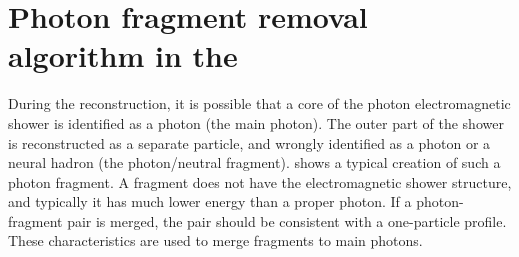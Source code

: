 \section{Photon fragment removal algorithm in the \ECAL}
\label{sec:photonFragRemoval}
During the reconstruction, it is possible that a core of the photon electromagnetic shower is identified as a photon (the main photon). The outer part of the shower is reconstructed as a separate particle, and wrongly identified as a photon or a neural hadron (the photon/neutral fragment).  shows a typical creation of such a photon fragment. A fragment does not have the electromagnetic shower structure, and typically it has much lower energy than a proper photon. If a photon-fragment pair is merged, the pair should be consistent with a one-particle profile. These characteristics are used to merge fragments to main photons.

